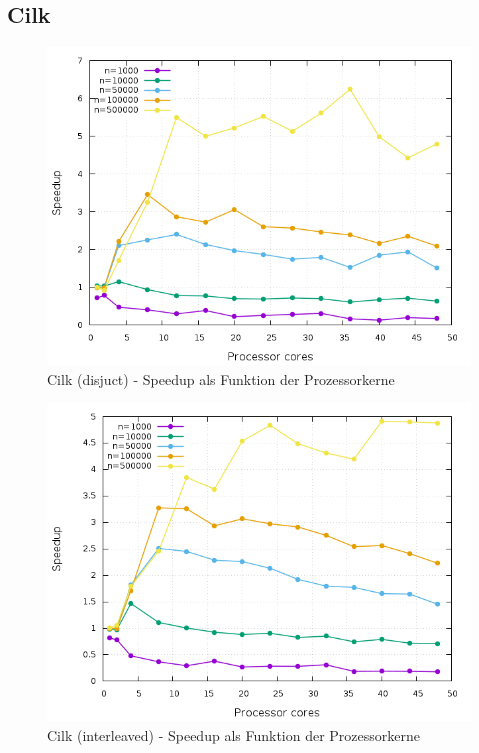 \subsection{Cilk}

\begin{figure}[htbp]
	\centering
	\includegraphics[width=404pt]{resources/plots/Cilk_Disjunct_sizes.png}
	\caption{Cilk (disjuct) - Speedup als Funktion der Prozessorkerne}
	\label{Cilk_Disjunct_sizes}
\end{figure}


\begin{figure}[htbp]
	\centering
	\includegraphics[width=404pt]{resources/plots/Cilk_Interleaved_sizes.png}
	\caption{Cilk (interleaved) - Speedup als Funktion der Prozessorkerne}
	\label{Cilk_Interleaved_sizes}
\end{figure}


